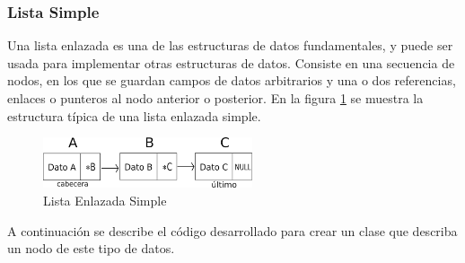 \subsubsection{Lista Simple}
Una lista enlazada es una de las estructuras de datos fundamentales, y puede ser usada para implementar otras estructuras de datos. Consiste en una secuencia de nodos, en los que se guardan campos de datos arbitrarios y una o dos referencias, enlaces o punteros al nodo anterior o posterior. En la figura \ref{fig:LES} se muestra la estructura típica de una lista enlazada simple.

\begin{figure}[H]
\centering
\includegraphics[width=0.55\textwidth]{imgs/Labo7/simp.png}
\caption{Lista Enlazada Simple}
\label{fig:LES}
\end{figure}

A continuación se describe el código desarrollado para crear un clase que describa un nodo de este tipo de datos.

